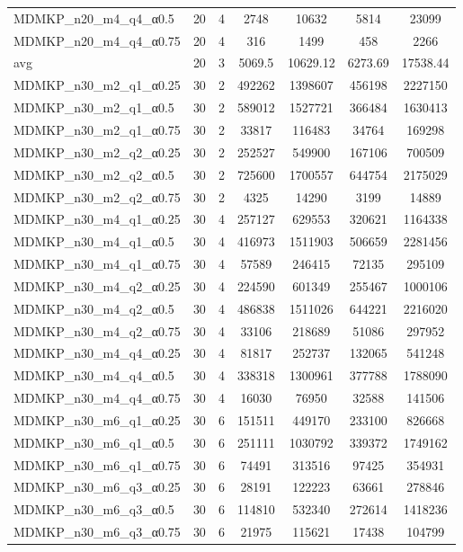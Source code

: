 \begin{table}[!ht]
\begin{tabular}{lcccccc}
MDMKP\_n20\_m4\_q4\_α0.5 & 20 & 4 & 2748 & 10632 & 5814 & 23099 \\
MDMKP\_n20\_m4\_q4\_α0.75 & 20 & 4 & 316 & 1499 & 458 & 2266 \\
\cline{1-9} avg & 20 & 3 & 5069.5& 10629.12 & 6273.69& 17538.44\\ \hline
MDMKP\_n30\_m2\_q1\_α0.25 & 30 & 2 & 492262 & 1398607 & 456198 & 2227150 \\
MDMKP\_n30\_m2\_q1\_α0.5 & 30 & 2 & 589012 & 1527721 & 366484 & 1630413 \\
MDMKP\_n30\_m2\_q1\_α0.75 & 30 & 2 & 33817 & 116483 & 34764 & 169298 \\
MDMKP\_n30\_m2\_q2\_α0.25 & 30 & 2 & 252527 & 549900 & 167106 & 700509 \\
MDMKP\_n30\_m2\_q2\_α0.5 & 30 & 2 & 725600 & 1700557 & 644754 & 2175029 \\
MDMKP\_n30\_m2\_q2\_α0.75 & 30 & 2 & 4325 & 14290 & 3199 & 14889 \\
MDMKP\_n30\_m4\_q1\_α0.25 & 30 & 4 & 257127 & 629553 & 320621 & 1164338 \\
MDMKP\_n30\_m4\_q1\_α0.5 & 30 & 4 & 416973 & 1511903 & 506659 & 2281456 \\
MDMKP\_n30\_m4\_q1\_α0.75 & 30 & 4 & 57589 & 246415 & 72135 & 295109 \\
MDMKP\_n30\_m4\_q2\_α0.25 & 30 & 4 & 224590 & 601349 & 255467 & 1000106 \\
MDMKP\_n30\_m4\_q2\_α0.5 & 30 & 4 & 486838 & 1511026 & 644221 & 2216020 \\
MDMKP\_n30\_m4\_q2\_α0.75 & 30 & 4 & 33106 & 218689 & 51086 & 297952 \\
MDMKP\_n30\_m4\_q4\_α0.25 & 30 & 4 & 81817 & 252737 & 132065 & 541248 \\
MDMKP\_n30\_m4\_q4\_α0.5 & 30 & 4 & 338318 & 1300961 & 377788 & 1788090 \\
MDMKP\_n30\_m4\_q4\_α0.75 & 30 & 4 & 16030 & 76950 & 32588 & 141506 \\
MDMKP\_n30\_m6\_q1\_α0.25 & 30 & 6 & 151511 & 449170 & 233100 & 826668 \\
MDMKP\_n30\_m6\_q1\_α0.5 & 30 & 6 & 251111 & 1030792 & 339372 & 1749162 \\
MDMKP\_n30\_m6\_q1\_α0.75 & 30 & 6 & 74491 & 313516 & 97425 & 354931 \\
MDMKP\_n30\_m6\_q3\_α0.25 & 30 & 6 & 28191 & 122223 & 63661 & 278846 \\
MDMKP\_n30\_m6\_q3\_α0.5 & 30 & 6 & 114810 & 532340 & 272614 & 1418236 \\
MDMKP\_n30\_m6\_q3\_α0.75 & 30 & 6 & 21975 & 115621 & 17438 & 104799 \\

\end{tabular}
\end{table}
